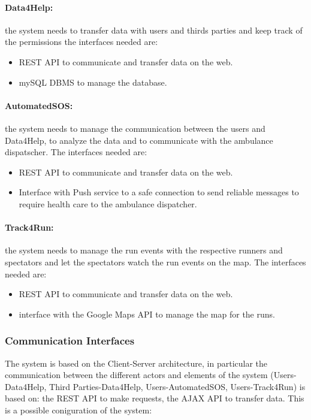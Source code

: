 \documentclass[a4paper]{article}
\begin{document}
    \paragraph{Data4Help:} the system needs to transfer data with users and thirds parties and keep track of the permissions the interfaces needed are:
    \begin{itemize}
        \item REST API to communicate and transfer data on the web.
        \item mySQL DBMS to manage the database.
    \end{itemize}
    
    \paragraph{AutomatedSOS:} the system needs to manage the communication between the users and Data4Help, to analyze the data and to communicate with the ambulance dispatscher. The interfaces needed are:
    
    \begin{itemize}
        \item REST API to communicate and transfer data on the web.
        \item Interface with Push service to a safe connection to send reliable messages to require health care to the ambulance dispatcher.
    \end{itemize}
    
    \paragraph{Track4Run:} the system needs to manage the run events with the respective runners and spectators and let the spectators watch the run events on the map. The interfaces needed are:
    
    \begin{itemize}
        \item REST API to communicate and transfer data on the web.
        \item interface with the Google Maps API to manage the map for the runs.
    \end{itemize}
    
    
    \subsubsection{Communication Interfaces}
    
    The system is based on the Client-Server architecture, in particular the communication between the different actors and elements of the system (Users-Data4Help, Third Parties-Data4Help, Users-AutomatedSOS, Users-Track4Run) is based on: the REST API to make requests, the AJAX API to transfer data.
    This is a possible coniguration of the system:
\end{document}
